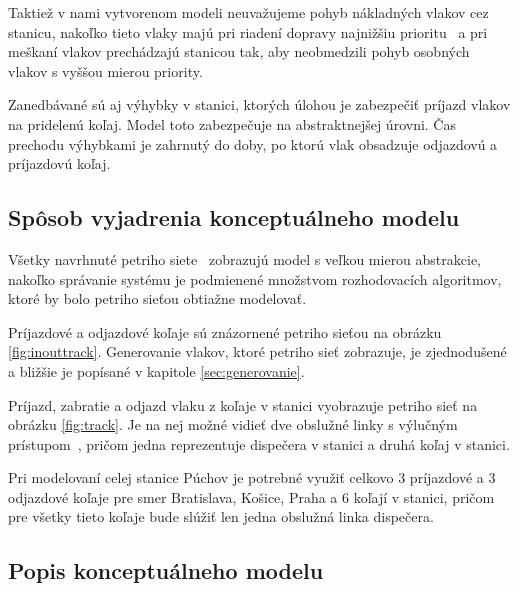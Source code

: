 \documentclass[12pt,a4paper,titlepage,final]{article}
\begin{document}
Taktiež v nami vytvorenom modeli neuvažujeme pohyb nákladných vlakov cez stanicu,
nakoľko tieto vlaky majú pri riadení dopravy najnižšiu prioritu~\cite[str.\,342]{riadenie}
a pri meškaní vlakov prechádzajú stanicou tak, aby neobmedzili pohyb osobných vlakov s vyššou mierou priority.

Zanedbávané sú aj výhybky v stanici, ktorých úlohou je zabezpečiť príjazd vlakov
na pridelenú koľaj. Model toto zabezpečuje na abstraktnejšej úrovni. Čas prechodu výhybkami
je zahrnutý do doby, po ktorú vlak obsadzuje odjazdovú a príjazdovú koľaj.

\subsection{Spôsob vyjadrenia konceptuálneho modelu}


Všetky navrhnuté petriho siete~\cite[str.\,31]{opora} zobrazujú model s veľkou mierou abstrakcie, nakoľko
správanie systému je podmienené množstvom rozhodovacích algoritmov, ktoré by bolo
petriho sieťou obtiažne modelovať.

Príjazdové a odjazdové koľaje sú znázornené petriho sieťou na obrázku \ref{fig:inouttrack}. Generovanie vlakov, ktoré petriho sieť zobrazuje, je zjednodušené a bližšie je popísané v kapitole \ref{sec:generovanie}.

Príjazd, zabratie a odjazd vlaku z koľaje v stanici vyobrazuje petriho sieť na obrázku \ref{fig:track}. Je na nej možné vidieť dve obslužné linky s výlučným prístupom~\cite[str.\,36]{opora}, pričom jedna reprezentuje dispečera v stanici a druhá koľaj v stanici.

Pri modelovaní celej stanice Púchov je potrebné využiť celkovo 3 príjazdové a 3 odjazdové koľaje pre smer Bratislava, Košice, Praha a 6 koľají v stanici, pričom pre všetky tieto koľaje bude slúžiť len jedna obslužná linka dispečera.

\subsection{Popis konceptuálneho modelu}
\end{document}
